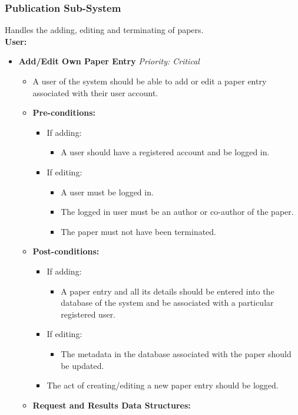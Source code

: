 \documentclass{article}
\begin{document}
			\subsubsection{Publication Sub-System}\label{subsubsec:publication}
				Handles the adding, editing and terminating of papers.\\
				[3mm]
				\textbf{User:}
				\begin{itemize}
					\item \textbf{Add/Edit Own Paper Entry} \hfill \textit{Priority: Critical}
					\begin{itemize}
						\item A user of the system should be able to add or edit a paper entry associated with their user account.
						\item \textbf{Pre-conditions:}
						\begin{itemize}
							\item If adding:
							\begin{itemize}
								\item A user should have a registered account and be logged in.
							\end{itemize}
							\item If editing:
							\begin{itemize}
								\item A user must be logged in.
								\item The logged in user must be an author or co-author of the paper.
								\item The paper must not have been terminated.
							\end{itemize}
						\end{itemize}
						\item \textbf{Post-conditions:}
						\begin{itemize}
							\item If adding:
							\begin{itemize}
								\item A paper entry and all its details should be entered into the database of the system and be associated with a particular registered user.
							\end{itemize}
							\item If editing:
							\begin{itemize}
								\item The metadata in the database associated with the paper should be updated.
							\end{itemize}													
							\item The act of creating/editing a new paper entry should be logged.
						\end{itemize}
						\item \textbf{Request and Results Data Structures:}
					\end{itemize}
					

\end{itemize}
\end{document}
